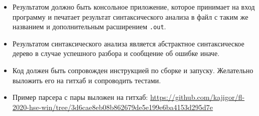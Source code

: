 \documentclass[12pt]{article}
\begin{document}
\begin{enumerate}
{\begin{itemize}
\begin{itemize}
        \item \verb!f ().! --- пустые скобки
      \end{itemize}
      \item Результатом должно быть консольное приложение, которое принимает на вход программу и печатает результат синтаксического анализа в файл с таким же названием и дополнительным расширением \verb!.out!.
      \item Результатом синтаксического анализа является абстрактное синтаксическое дерево в случае успешного разбора и сообщение об ошибке иначе.
      \item Код должен быть сопровожден инструкцией по сборке и запуску. Желательно выложить его на гитхаб и сопроводить тестами.
      \item Пример парсера с пары выложен на гитхаб: \url{https://github.com/kajigor/fl-2020-hse-win/tree/3d6cae8eb08b862679de5e199e6ba4153d295d7e}
    \end{itemize}
  }
\end{enumerate}
\end{document}
